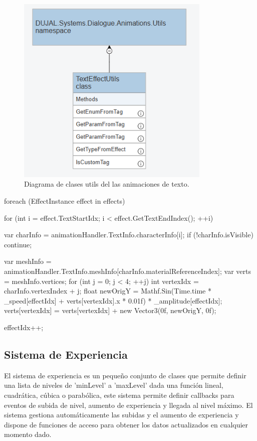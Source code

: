 \begin{figure}[H]
  \centering
    \includegraphics[width=350px,clip=true]{Text_Effect_Utils.png}
  \caption{Diagrama de clases utils del las animaciones de texto.}
  \label{fig:dialogueUml4}
\end{figure}

\begin{mypython}[caption={Ejemplo de código utilizado para definir la animación de 'Wobble' en el texto.},label={alg:wobbleAnimation}]
    foreach (EffectInstance effect in effects) 
    {
        for (int i = effect.TextStartIdx; i < effect.GetTextEndIndex(); ++i)
        {
            var charInfo = animationHandler.TextInfo.characterInfo[i];
            if (!charInfo.isVisible)
            {
                continue;
            }
            
            var meshInfo = animationHandler.TextInfo.meshInfo[charInfo.materialReferenceIndex];
            var verts = meshInfo.vertices;
            for (int j = 0; j < 4; ++j)
            {
                int vertexIdx = charInfo.vertexIndex + j;
                float newOrigY = Mathf.Sin(Time.time * _speed[effectIdx] + verts[vertexIdx].x * 0.01f) * _amplitude[effectIdx];
                verts[vertexIdx] = verts[vertexIdx] + new Vector3(0f, newOrigY, 0f);
            }
        }
        effectIdx++;
    }
\end{mypython}

\subsection{Sistema de Experiencia}
El sistema de experiencia es un pequeño conjunto de clases que permite definir una lista de niveles de 'minLevel' a 'maxLevel' dada una función lineal, cuadrática, cúbica o 
 parabólica, este sistema permite definir callbacks para eventos de subida de nivel, aumento de experiencia y llegada al nivel máximo. El sistema gestiona automáticamente las
 subidas y el aumento de experiencia y dispone de funciones de acceso para obtener los datos actualizados en cualquier momento dado.

